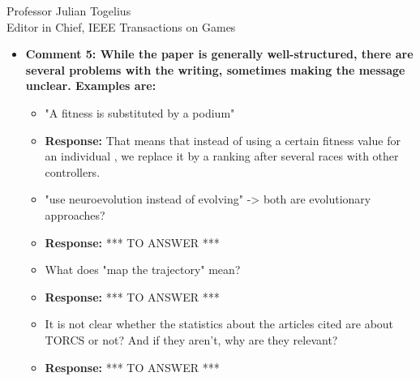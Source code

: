 \documentclass[10pt]{letter} %
\begin{document}
\begin{letter}{Professor Julian Togelius \\ Editor in Chief, IEEE Transactions on Games}
\begin{enumerate}
\begin{itemize}
\begin{itemize}
					
			\item	the approach could generalise to other types of controllers (6)
					\item {\bf Response:} 
					We wrote down in the paper that {\em 'The result could be generalized to any kind
					of controller, as long as the evolution process has the possibility to explore the
					space of controllers in the same, efficient, way'}
				Indeed, that main result of the paper is that we can tune the parameters of  TORCS fuzzy controller with an evolutionary process  using a sort of a fitnessless selection. This finding could be generalized to any other TORCS controller when an evolution parameters tuning is needed.\\
				
			\item	reduced diversity is good (1) -> usually, the opposite is true in my experience
					\item {\bf Response:} *** TO ANSWER ***
			\end{itemize}


		\item {\bf 	  Comment 5: While the paper is generally well-structured, there are several problems with the writing, sometimes making the message unclear. Examples are:}
			\begin{itemize}
			\item "A fitness is substituted by a podium"
					\item {\bf Response:} 
					That means that instead of using a certain fitness value for an individual , we replace it by a ranking after several races with other controllers.\\
					
			\item "use neuroevolution instead of evolving" -> both are evolutionary approaches?
					\item {\bf Response:} *** TO ANSWER ***\\
			\item What does "map the trajectory" mean?
					\item {\bf Response:} *** TO ANSWER ***\\
			\item It is not clear whether the statistics about the articles cited are about TORCS or not? And if they aren't, why are they relevant?
					\item {\bf Response:} *** TO ANSWER ***\\
					

\end{itemize}
\end{itemize}
\end{enumerate}
\end{letter}
\end{document}
